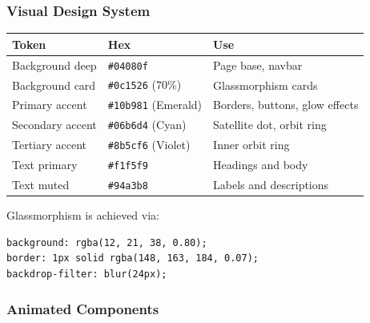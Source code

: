 \documentclass[12pt, a4paper]{article}
\begin{document}
\subsubsection{Visual Design System}

\begin{center}
\renewcommand{\arraystretch}{1.2}
\begin{tabular}{lll}
\toprule
\textbf{Token} & \textbf{Hex} & \textbf{Use} \\
\midrule
Background deep  & \texttt{\#04080f} & Page base, navbar \\
Background card  & \texttt{\#0c1526} (70\%) & Glassmorphism cards \\
Primary accent   & \texttt{\#10b981} (Emerald) & Borders, buttons, glow effects \\
Secondary accent & \texttt{\#06b6d4} (Cyan) & Satellite dot, orbit ring \\
Tertiary accent  & \texttt{\#8b5cf6} (Violet) & Inner orbit ring \\
Text primary     & \texttt{\#f1f5f9} & Headings and body \\
Text muted       & \texttt{\#94a3b8} & Labels and descriptions \\
\bottomrule
\end{tabular}
\end{center}

Glassmorphism is achieved via:
\begin{verbatim}
background: rgba(12, 21, 38, 0.80);
border: 1px solid rgba(148, 163, 184, 0.07);
backdrop-filter: blur(24px);
\end{verbatim}

\subsubsection{Animated Components}
\end{document}
